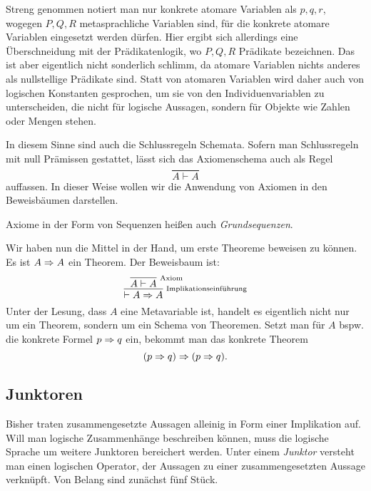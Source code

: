 Streng genommen notiert man nur konkrete atomare Variablen als $p,q,r$,
wogegen $P,Q,R$ metasprachliche Variablen sind, für die konkrete atomare
Variablen eingesetzt werden dürfen. Hier ergibt sich allerdings eine
Überschneidung mit der Prädikatenlogik, wo $P,Q,R$ Prädikate bezeichnen.
Das ist aber eigentlich nicht sonderlich schlimm, da atomare Variablen
nichts anderes als nullstellige Prädikate sind. Statt von atomaren
Variablen wird daher auch von logischen Konstanten gesprochen, um sie
von den Individuenvariablen zu unterscheiden, die nicht für logische
Aussagen, sondern für Objekte wie Zahlen oder Mengen stehen.

In diesem Sinne sind auch die Schlussregeln Schemata. Sofern man
Schlussregeln mit null Prämissen gestattet, lässt sich das
Axiomenschema auch als Regel
\[\dfrac{}{A\vdash A}\]
auffassen. In dieser Weise wollen wir die Anwendung von Axiomen in den
Beweisbäumen darstellen.

Axiome in der Form von Sequenzen heißen auch
\emph{Grundsequenzen}.

Wir haben nun die Mittel in der Hand, um erste Theoreme beweisen
zu können. Es ist $A\Rightarrow A$ ein Theorem. Der Beweisbaum ist:
\[
\infer[\infernote{Implikationseinführung}]{\vdash A\cond A}{
  \infer[\infernote{Axiom}]{A\vdash A}{}}
\]
Unter der Lesung, dass $A$ eine Metavariable ist, handelt es
eigentlich nicht nur um ein Theorem, sondern um ein Schema von
Theoremen. Setzt man für $A$ bspw. die konkrete
Formel $p\Rightarrow q$ ein, bekommt man das konkrete Theorem
\[(p\Rightarrow q)\Rightarrow (p\Rightarrow q).\]

\subsection{Junktoren}

Bisher traten zusammengesetzte Aussagen alleinig in Form einer
Implikation auf. Will man logische Zusammenhänge beschreiben können,
muss die logische Sprache um weitere Junktoren bereichert werden.
Unter einem \emph{Junktor} versteht man einen logischen
Operator, der Aussagen zu einer zusammengesetzten Aussage verknüpft.
Von Belang sind zunächst fünf Stück.

